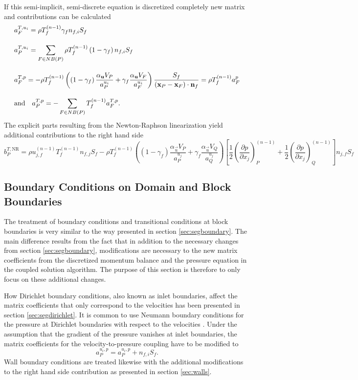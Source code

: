 If this semi-implicit, semi-discrete equation is discretized completely new matrix and contributions can be calculated
\begin{align*}
  \allowdisplaybreaks
  &a_F^{T,u_i} = \rho T_f^{(n-1)} \gamma_f n_{f,i} S_f \\[1.0em] 
  &a_P^{T,u_i} = \sum_{F \in NB(P)} \rho T_f^{(n-1)} \left(1-\gamma_f\right) n_{f,i} S_f \\[1.0em]
  &a_F^{T,p} = -\rho T_f^{(n-1)} \left(\left(1 - \gamma_f\right) \frac{\alpha_\vec{u} V_P}{a_P^{u_i}} + \gamma_f \frac{\alpha_\vec{u} V_F}{a_F^{u_i}}\right) \frac{S_f}{\left(\vec{x}_P - \vec{x}_F\right) \cdot \vec{n}_f} = \rho T_f^{(n-1)} a_F^{p} \\[1.0em] 
  &\text{and} \quad
  a_P^{T,p} = - \sum_{F \in NB(P)} T_f^{(n-1)} a_F^{T,p}.
\end{align*}
The explicit parts resulting from the Newton-Raphson linearization yield additional contributions to the right hand side
\begin{displaymath}
  b_P^{T,\text{NR}} 
  = 
  \rho u_{j,f}^{(n-1)} T_f^{(n-1)} n_{f,j} S_f 
  - \rho T_f^{(n-1)} \left(\left(1 - \gamma_f\right) \frac{\alpha_\vec{u} V_P}{a_P^{u_j}} + \gamma_f \frac{\alpha_\vec{u} V_Q}{a_Q^{u_j}}\right)
    \left[ 
    \frac{1}{2} \left( \frac{\partial p}{\partial x_j} \right)_P^{(n-1)} 
    + \frac{1}{2} \left(\frac{\partial p}{\partial x_j}\right)_Q^{(n-1)} 
    \right] n_{j,f} S_f
\end{displaymath}

\subsection{Boundary Conditions on Domain and Block Boundaries}

The treatment of boundary conditions and transitional conditions at block boundaries is very similar to the way presented in section \ref{sec:segboundary}. The main difference results from the fact that in addition to the necessary changes from section \ref{sec:segboundary}, modifications are necessary to the new matrix coefficients from the discretized momentum balance and the pressure equation in the coupled solution algorithm. The purpose of this section is therefore to only focus on these additional changes.

How Dirichlet boundary conditions, also known as inlet boundaries, affect the matrix coefficients that only correspond to the velocities has been presented in section \ref{sec:segdirichlet}. It is common to use Neumann boundary conditions for the pressure at Dirichlet boundaries with respect to the velocities \cite{darwish09}. Under the assumption that the gradient of the pressure vanishes at inlet boundaries, the matrix coefficients for the velocity-to-pressure coupling have to be modified to 
\begin{displaymath}
  a_P^{u_i,p} = a_P^{u_i,p} + n_{f,i} S_f.
\end{displaymath}
Wall boundary conditions are treated likewise with the additional modifications to the right hand side contribution as presented in section \ref{sec:walls}.

